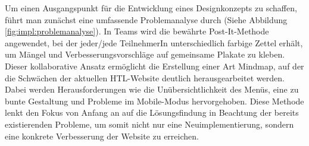 Um einen Ausgangspunkt für die Entwicklung eines Designkonzepts zu schaffen, 
führt man zunächst eine umfassende Problemanalyse durch (Siehe Abbildung \ref{fig:impl:problemanalyse}). In Teams wird die bewährte Post-It-Methode angewendet, 
bei der jeder/jede TeilnehmerIn unterschiedlich farbige Zettel erhält, um Mängel und Verbesserungsvorschläge auf gemeinsame Plakate zu kleben. 
Dieser kollaborative Ansatz ermöglicht die Erstellung einer Art Mindmap, auf der die Schwächen der aktuellen HTL-Website deutlich herausgearbeitet werden. 
Dabei werden Herausforderungen wie die Unübersichtlichkeit des Menüs, eine zu bunte Gestaltung und Probleme im Mobile-Modus hervorgehoben. 
Diese Methode lenkt den Fokus von Anfang an auf die Lösungsfindung in Beachtung der bereits existierenden Probleme, um somit nicht nur eine Neuimplementierung, 
sondern eine konkrete Verbesserung der Website zu erreichen.


